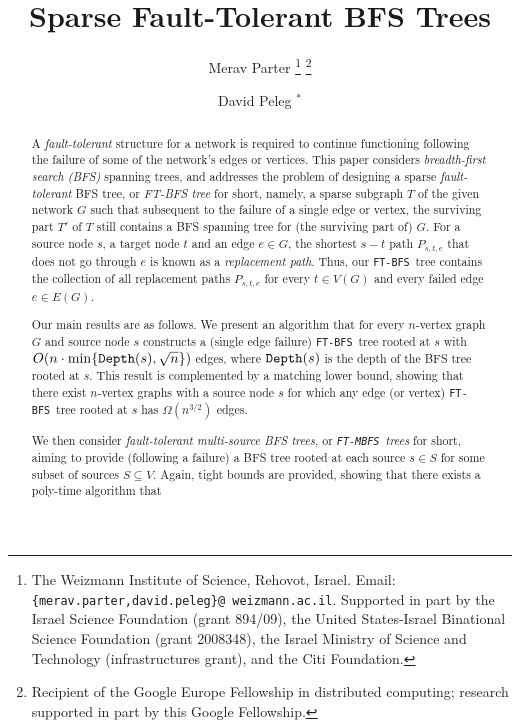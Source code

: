 \documentclass[12pt]{article}
\def\Depth{\mbox{\tt Depth}}
\def\FTMBFS{\mbox{\tt FT-MBFS}}
\def\FTBFS{\mbox{\tt FT-BFS}}
\begin{document}
\title{Sparse Fault-Tolerant BFS Trees}
\author{
Merav Parter
\thanks{The Weizmann Institute of Science, Rehovot, Israel.
Email: {\tt \{merav.parter,david.peleg\}@ weizmann.ac.il}.
Supported in part by the Israel Science Foundation
(grant 894/09), the United States-Israel Binational Science Foundation
(grant 2008348), the Israel Ministry of Science and Technology
(infrastructures grant), and the Citi Foundation.}
\thanks{Recipient of the Google Europe Fellowship in distributed computing;
 research supported in part by this Google Fellowship.}
\and
David Peleg $^*$
}


\maketitle

\begin{abstract}
A {\em fault-tolerant} structure for a network is required to continue
functioning following the failure of some of the network's edges or vertices.
This paper considers {\em breadth-first search (BFS)} spanning trees,
and addresses the problem of designing a sparse {\em fault-tolerant} BFS tree,
or {\em FT-BFS tree} for short, namely, a sparse subgraph $T$ of the given network $G$
such that subsequent to the failure of a single edge or vertex,
the surviving part $T'$ of $T$ still contains a BFS spanning tree for
(the surviving part of) $G$. For a source node $s$, a target node $t$ and an edge $e\in G$, the shortest $s-t$ path $P_{s,t,e}$ that does not go through $e$  is known as a \emph{replacement path}. Thus, our \FTBFS\ tree contains the collection of all replacement paths $P_{s,t,e}$ for every $t \in V(G)$ and every failed edge $e \in E(G)$.
\par
Our main results are as follows. We present an algorithm that
for every $n$-vertex graph $G$ and source node $s$ constructs
a (single edge failure) \FTBFS\ tree rooted at $s$ with
$O(n \cdot \min\{\Depth(s), \sqrt{n}\})$ edges,
where $\Depth(s)$ is the depth of the BFS tree rooted at $s$.
This result is complemented by a matching lower bound, showing that
there exist $n$-vertex graphs with a source node $s$ for which any edge
(or vertex) \FTBFS\ tree rooted at $s$ has $\Omega(n^{3/2})$ edges.
\par
We then consider {\em fault-tolerant multi-source BFS trees},
or {\em \FTMBFS\ trees} for short,
aiming to provide (following a failure) a BFS tree rooted at each source
$s\in S$ for some subset of sources $S\subseteq V$.
Again, tight bounds are provided,
showing that there exists a poly-time algorithm that

\end{abstract}
\end{document}
